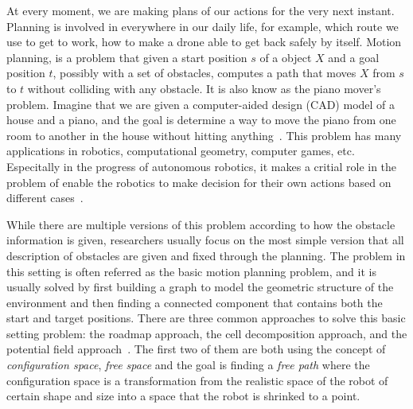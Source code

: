 
At every moment, we are making plans of our actions for the very next instant.
Planning is involved in everywhere in our daily life, for example, which route we use to get to work, how to make a drone able to get back safely by itself.
Motion planning, is a problem that given a start position \(s\) of a object \(X\) and a goal position \(t\), possibly with a set of obstacles, computes a path that moves \(X\) from \(s\) to \(t\) without colliding with any obstacle.
It is also know as the piano mover's problem.
Imagine that we are given a computer-aided design (CAD) model of a house and a piano, and the goal is determine a way to move the piano from one room to another in the house without hitting anything~\cite{lavalle2006planning}.
This problem has many applications in robotics, computational geometry, computer games, etc. Especitally in the progress of autonomous robotics, it makes a critial role in the problem of enable the robotics to make decision for their own actions based on different cases~\cite{eric98}.

While there are multiple versions of this problem according to how the obstacle information is given, researchers usually focus on the most simple version that all description of obstacles are given and fixed through the planning.
The problem in this setting is often referred as the basic motion planning problem, and it is usually solved by first building a graph to model the geometric structure of the environment and then finding a connected component that contains both the start and target positions. There are three common approaches to solve this basic setting problem: the roadmap approach, the cell decomposition approach, and the potential field approach~\cite{eric98}. The first two of them are both using the concept of \textit{configuration space}, \textit{free space} and the goal is finding a \textit{free path} where the configuration space is a transformation from the realistic space of the robot of certain shape and size into a space that the robot is shrinked to a point.
